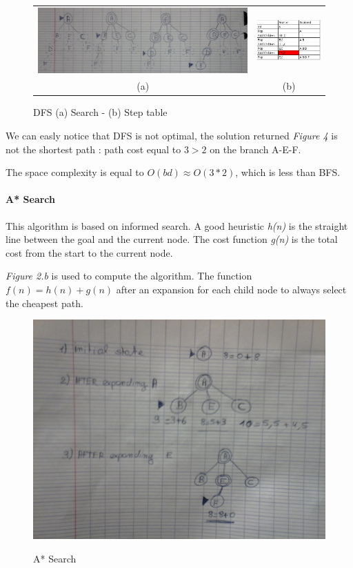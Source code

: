 \begin{figure}[h]
    \centering
    \begin{tabular}{cc}
      \includegraphics[width=.54\linewidth,scale=1]{./images/dfs.jpg} & \includegraphics[width=.29  \linewidth, scale=1.5]{./images/dfs_table.png} \\
      \hspace{0.5cm} (a) & \hspace{0.5cm} (b)
    \end{tabular}
    \caption{DFS (a) Search - (b) Step table \label{fig:DFS}}
\end{figure}

We can easly notice that DFS is not optimal, the solution returned \textit{Figure 4}
is not the shortest path : path cost equal to
$3>2$ on the branch A-E-F.

The space complexity is equal to $O(bd) \approx O(3*2)$, which is less than BFS.
\thispagestyle{empty}

\paragraph{A* Search}

This algorithm is based on informed search.
A good heuristic \textit{h(n)} is the straight line between the goal and
the current node. The cost function \textit{g(n)} is the total cost from the start
to the current node.

\textit{Figure 2.b} is used to compute the algorithm. The function
$f(n)=h(n)+g(n)$ after an expansion for each child node to always select the
cheapest path.

\begin{figure}[h]
    \centering
      \includegraphics[width=.73\linewidth,scale=1]{./images/astar.jpg} \\
    \caption{A* Search \label{fig:Astar}}
\end{figure}

